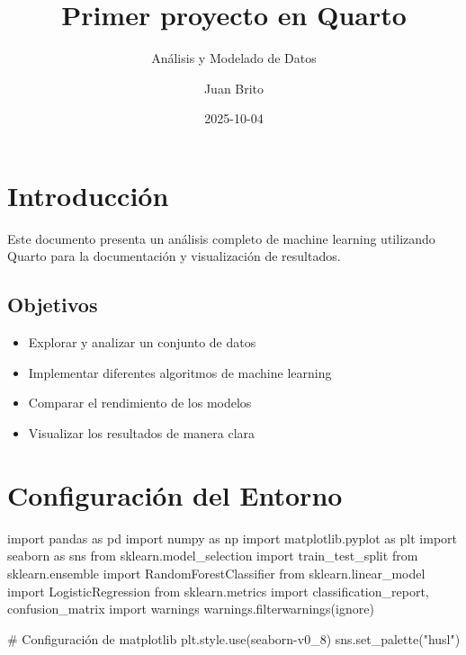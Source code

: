 \documentclass[
]{article}
\title{Primer proyecto en Quarto}
\subtitle{Análisis y Modelado de Datos}
\author{Juan Brito}
\date{2025-10-04}
\newenvironment{Shaded}{\begin{snugshade}}{\end{snugshade}}
\newcommand{\CommentTok}[1]{\textcolor[rgb]{0.37,0.37,0.37}{#1}}
\newcommand{\ImportTok}[1]{\textcolor[rgb]{0.00,0.46,0.62}{#1}}
\newcommand{\NormalTok}[1]{\textcolor[rgb]{0.00,0.23,0.31}{#1}}
\newcommand{\StringTok}[1]{\textcolor[rgb]{0.13,0.47,0.30}{#1}}
\providecommand{\tightlist}{%
  \setlength{\itemsep}{0pt}\setlength{\parskip}{0pt}}
\begin{document}
\maketitle


\section{Introducción}\label{introducciuxf3n}

Este documento presenta un análisis completo de machine learning
utilizando Quarto para la documentación y visualización de resultados.

\subsection{Objetivos}\label{objetivos}

\begin{itemize}
\tightlist
\item
  Explorar y analizar un conjunto de datos
\item
  Implementar diferentes algoritmos de machine learning
\item
  Comparar el rendimiento de los modelos
\item
  Visualizar los resultados de manera clara
\end{itemize}

\section{Configuración del Entorno}\label{configuraciuxf3n-del-entorno}

\label{setup}
\begin{Shaded}
\begin{Highlighting}[]
\ImportTok{import}\NormalTok{ pandas }\ImportTok{as}\NormalTok{ pd}
\ImportTok{import}\NormalTok{ numpy }\ImportTok{as}\NormalTok{ np}
\ImportTok{import}\NormalTok{ matplotlib.pyplot }\ImportTok{as}\NormalTok{ plt}
\ImportTok{import}\NormalTok{ seaborn }\ImportTok{as}\NormalTok{ sns}
\ImportTok{from}\NormalTok{ sklearn.model\_selection }\ImportTok{import}\NormalTok{ train\_test\_split}
\ImportTok{from}\NormalTok{ sklearn.ensemble }\ImportTok{import}\NormalTok{ RandomForestClassifier}
\ImportTok{from}\NormalTok{ sklearn.linear\_model }\ImportTok{import}\NormalTok{ LogisticRegression}
\ImportTok{from}\NormalTok{ sklearn.metrics }\ImportTok{import}\NormalTok{ classification\_report, confusion\_matrix}
\ImportTok{import}\NormalTok{ warnings}
\NormalTok{warnings.filterwarnings(}\StringTok{\textquotesingle{}ignore\textquotesingle{}}\NormalTok{)}

\CommentTok{\# Configuración de matplotlib}
\NormalTok{plt.style.use(}\StringTok{\textquotesingle{}seaborn{-}v0\_8\textquotesingle{}}\NormalTok{)}
\NormalTok{sns.set\_palette(}\StringTok{"husl"}\NormalTok{)}
\end{Highlighting}
\end{Shaded}
\end{document}

